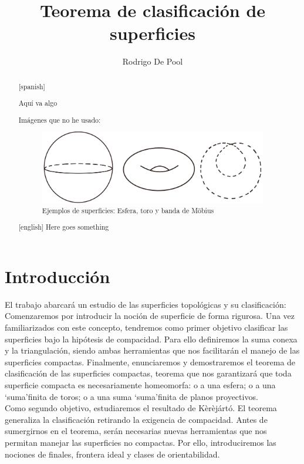 \documentclass[a4paper,11pt,spanish, twoside, leqno]{tfg-uam}
\title{Teorema de clasificación de superficies}
\author{Rodrigo De Pool}
\theoremstyle{definition}
\begin{document}
\begin{abstract}[spanish]

Aquí va algo


Imágenes que no he usado: 

\begin{figure}[h!]
	\centering
	\includegraphics[width=0.5\linewidth]{imagenes/superficies.png}
	\caption{Ejemplos de superficies: Esfera, toro y banda de M\"obius}
	\label{fig:superficies sencillas}
\end{figure} 

\end{abstract}

\begin{abstract}[english]
Here goes something

\end{abstract}


\mainmatter
\chapter{Introducción}


El trabajo abarcará un estudio de las superficies topológicas y su clasificación:
\\

  
  Comenzaremos por introducir la noción de superficie de forma rigurosa. Una vez familiarizados con este concepto, tendremos como primer objetivo clasificar las superficies bajo la hipótesis de compacidad. Para ello definiremos la suma conexa y la triangulación, siendo ambas herramientas que nos facilitarán el manejo de las superficies compactas. Finalmente, enunciaremos y demostraremos el teorema de clasificación de las superficies compactas, teorema que nos garantizará que toda superficie compacta es necesariamente homeomorfa: o a una esfera; o a una \textquoteleft suma\textquoteright  finita de toros; o a una suma \textquoteleft suma\textquoteright  finita de planos proyectivos.
 \\
  
  Como segundo objetivo, estudiaremos el resultado de K\`er\`ejártó. El teorema generaliza la clasificación retirando la exigencia de compacidad. Antes de sumergirnos en el teorema, serán necesarias nuevas herramientas que nos permitan manejar las superficies no compactas. Por ello, introduciremos las nociones de finales, frontera ideal y clases de orientabilidad.
  \\
  
\end{document}
